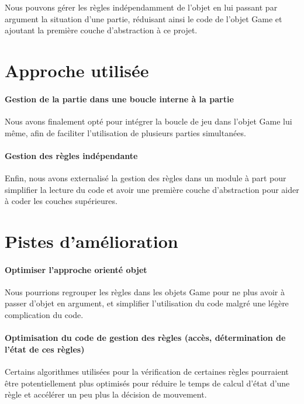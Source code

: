 \documentclass{scrreprt}
\begin{document}
			Nous pouvons gérer les règles indépendamment de l'objet en lui passant par argument la situation d'une partie, réduisant ainsi le code de l'objet Game et ajoutant la première couche d'abstraction à ce projet.
		
		\section{Approche utilisée}
			
			\paragraph{Gestion de la partie dans une boucle interne à la partie}
			
			Nous avons finalement opté pour intégrer la boucle de jeu dans l'objet Game lui même, afin de faciliter l'utilisation de plusieurs parties simultanées.
			
			
			\paragraph{Gestion des règles indépendante}
			
			Enfin, nous avons  externalisé la gestion des règles dans un module à part pour simplifier la lecture du code et avoir une première couche d'abstraction pour aider à coder les couches supérieures.
					
		\section{Pistes d'amélioration}
			 \paragraph{Optimiser l'approche orienté objet}
			 
			 Nous pourrions regrouper les règles dans les objets Game pour ne plus avoir à passer d'objet en argument, et simplifier l'utilisation du code malgré une légère complication du code. 
			 
			 \paragraph{Optimisation du code de gestion des règles (accès, détermination de l'état de ces règles)}
			 Certains algorithmes utilisées pour la vérification de certaines règles pourraient être potentiellement plus optimisés pour réduire le temps de calcul d'état d'une règle et accélérer un peu plus la décision de mouvement.
\end{document}
